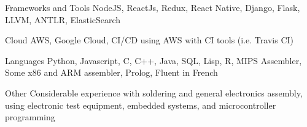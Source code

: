 
\begin{cvskills}
  \vspace{2mm}
  \cvskill
    {Frameworks and Tools}
    {NodeJS, ReactJs, Redux, React Native, Django, Flask, LLVM, ANTLR, ElasticSearch}

  \vspace{2mm}
  \cvskill
    {Cloud}
    {AWS, Google Cloud, CI/CD using AWS with CI tools (i.e. Travis CI)}

  \vspace{2mm}
  \cvskill
    {Languages} %
    {Python, Javascript, C, C++, Java, SQL, Lisp, R, MIPS Assembler, Some x86 and ARM assembler, Prolog, Fluent in French}

  \vspace{2mm}
  \cvskill
    {Other}
    {Considerable experience with soldering and general electronics assembly, using electronic test equipment, \newline
    embedded systems, and microcontroller programming}
\end{cvskills}
